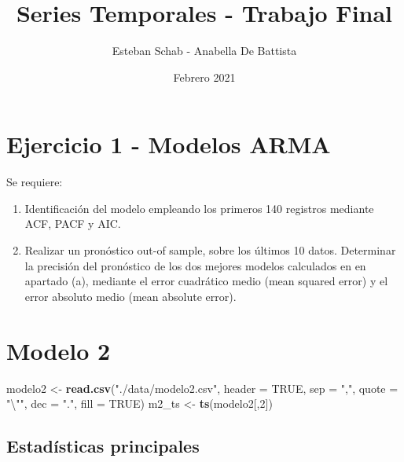 \documentclass[
  11pt,
]{article}
\title{Series Temporales - Trabajo Final}
\author{Esteban Schab - Anabella De Battista}
\date{Febrero 2021}
\newenvironment{Shaded}{\begin{snugshade}}{\end{snugshade}}
\newcommand{\CharTok}[1]{\textcolor[rgb]{0.31,0.60,0.02}{#1}}
\newcommand{\DataTypeTok}[1]{\textcolor[rgb]{0.13,0.29,0.53}{#1}}
\newcommand{\DecValTok}[1]{\textcolor[rgb]{0.00,0.00,0.81}{#1}}
\newcommand{\KeywordTok}[1]{\textcolor[rgb]{0.13,0.29,0.53}{\textbf{#1}}}
\newcommand{\NormalTok}[1]{#1}
\newcommand{\OtherTok}[1]{\textcolor[rgb]{0.56,0.35,0.01}{#1}}
\newcommand{\StringTok}[1]{\textcolor[rgb]{0.31,0.60,0.02}{#1}}
\begin{document}
\maketitle

{
\setcounter{tocdepth}{2}
\tableofcontents
}
\clearpage

\hypertarget{ejercicio-1---modelos-arma}{%
\section{Ejercicio 1 - Modelos ARMA}\label{ejercicio-1---modelos-arma}}

Se requiere:

\begin{enumerate}
\def\labelenumi{\alph{enumi}.}
\item
  Identificación del modelo empleando los primeros 140 registros
  mediante ACF, PACF y AIC.
\item
  Realizar un pronóstico out-of sample, sobre los últimos 10 datos.
  Determinar la precisión del pronóstico de los dos mejores modelos
  calculados en en apartado (a), mediante el error cuadrático medio
  (mean squared error) y el error absoluto medio (mean absolute error).
\end{enumerate}

\hypertarget{modelo-2}{%
\section{Modelo 2}\label{modelo-2}}

\begin{Shaded}
\begin{Highlighting}[]
\NormalTok{modelo2 <-}\StringTok{ }\KeywordTok{read.csv}\NormalTok{(}\StringTok{"./data/modelo2.csv"}\NormalTok{, }\DataTypeTok{header =} \OtherTok{TRUE}\NormalTok{, }\DataTypeTok{sep =} \StringTok{","}\NormalTok{, }\DataTypeTok{quote =} \StringTok{"}\CharTok{\textbackslash{}"}\StringTok{"}\NormalTok{, }
                    \DataTypeTok{dec =} \StringTok{"."}\NormalTok{, }\DataTypeTok{fill =} \OtherTok{TRUE}\NormalTok{)}
\NormalTok{m2_ts <-}\StringTok{ }\KeywordTok{ts}\NormalTok{(modelo2[,}\DecValTok{2}\NormalTok{])}
\end{Highlighting}
\end{Shaded}

\hypertarget{estaduxedsticas-principales}{%
\subsection{Estadísticas
principales}\label{estaduxedsticas-principales}}
\end{document}
